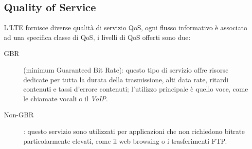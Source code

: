 \subsection{Quality of Service}
\label{sec:qos}
L'\ac{LTE} fornisce diverse qualità di servizio \ac{QoS}, ogni flusso informativo è associato ad una specifica classe di \ac{QoS}, i 
livelli di \ac{QoS} offerti sono due:
\begin{description}
 \item[GBR] (minimum Guaranteed Bit Rate): questo tipo di servizio offre risorse dedicate per tutta la durata della trasmissione, alti
 data rate, ritardi contenuti e  tassi d'errore contenuti;  l'utilizzo principale è quello voce, come le chiamate vocali o il \emph{VoIP}.
 \item[Non-GBR]: questo servizio sono utilizzati per applicazioni che non richiedono bitrate particolarmente elevati, come il web browsing
 o i trasferimenti FTP.
\end{description}

